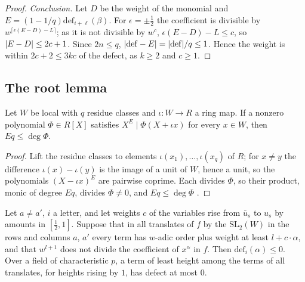 \begin{proof}
\emph{Conclusion.} Let $D$ be the weight of the monomial and $E=(1-1/q)\mathrm{def}_{i+\ell}(\beta)$. For $\epsilon=\pm\frac12$ the coefficient is divisible by $w^{\lceil\epsilon(E-D)-L\rceil}$; as it is not divisible by $w^c$, $\epsilon(E-D)-L\le c$, so $\lvert E-D\rvert\le2c+1$. Since $2n\le q$, $\lvert \mathrm{def}-E\rvert=\lvert \mathrm{def}\rvert/q\le1$. Hence the weight is within $2c+2\le3kc$ of the defect, as $k\ge2$ and $c\ge1$.
\end{proof}

\subsection{The root lemma}\label{ss:root-lemma}

\begin{lemma}\label{lem:stepanov-count}
Let $W$ be local with $q$ residue classes and $\iota\colon W\to R$ a ring map. If a nonzero polynomial $\Phi\in R[X]$ satisfies $X^E\mid\Phi(X+\iota x)$ for every
$x\in W$, then $Eq\le\deg\Phi$.
\end{lemma}

\begin{proof}
Lift the residue classes to elements $\iota(x_1),\dots,\iota(x_q)$ of $R$; for $x\ne y$ the difference $\iota(x)-\iota(y)$ is the image of a unit of $W$, hence a unit, so the polynomials $(X-\iota x)^E$ are pairwise coprime. Each divides $\Phi$, so their product, monic of degree $Eq$, divides $\Phi\ne0$, and $Eq\le\deg\Phi$ \cite{Stepanov1969,Bombieri1974}.
\end{proof}

\begin{theorem}\label{thm:root-lemma}
Let $a\ne a'$, $i$ a letter, and let weights $c$ of the variables rise from $\bar u_s$ to $u_s$ by amounts in $[\frac12,1]$. Suppose that in all translates of $f$
by the $\mathrm{SL}_2(W)$ in the rows and columns $a$, $a'$ every term has $w$-adic order plus weight at least $l+c\cdot\alpha$, and that $w^{l+1}$ does not divide
the coefficient of $x^\alpha$ in $f$. Then $\mathrm{def}_i(\alpha)\le0$. Over a field of characteristic $p$, a term of least height among the terms of all
translates, for heights rising by $1$, has defect at most $0$.
\end{theorem}

